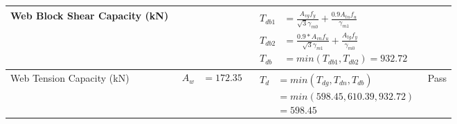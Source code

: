\documentclass{article}%
\begin{document}
\begin{longtable}{|p{4cm}|p{6cm}|p{5.5cm}|p{1.5cm}|}
\hline%
Web Block Shear Capacity (kN)&&$\begin{aligned}T_{db1} &= \frac{A_{vg} f_{y}}{\sqrt{3} \gamma_{m0}} + \frac{0.9 A_{tn} f_{u}}{\gamma_{m1}}\\ T_{db2} &= \frac{0.9*A_{vn} f_{u}}{\sqrt{3} \gamma_{m1}} + \frac{A_{tg} f_{y}}{\gamma_{m0}}\\ T_{db} &= min(T_{db1}, T_{db2})= 932.72\end{aligned}$&\\%
\hline%
Web Tension Capacity (kN)&$\begin{aligned} A_w &=172.35\end{aligned}$&$\begin{aligned} T_d &= min(T_{dg},T_{dn},T_{db})\\ &= min(598.45,610.39,932.72)\\ &=598.45\end{aligned}$&Pass\\%
\hline%
\end{longtable}

%
\newpage%
\end{document}
